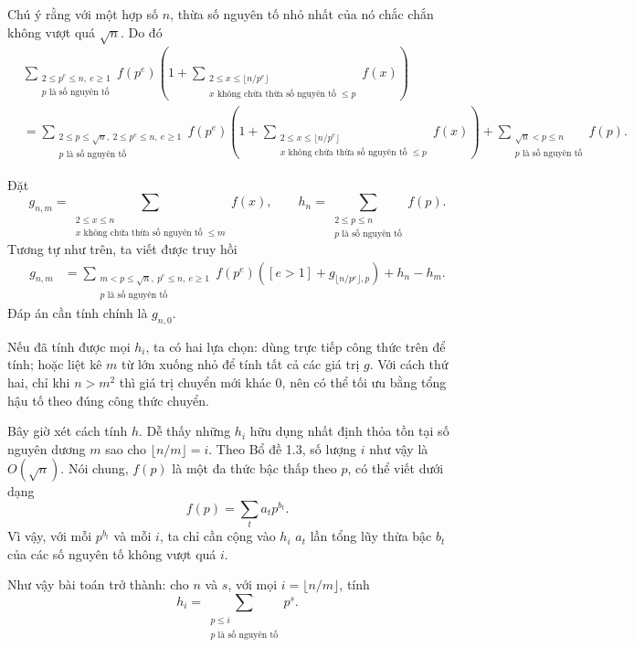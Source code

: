 \documentclass[11pt]{article}
\begin{document}
Chú ý rằng với một hợp số \(n\), thừa số nguyên tố nhỏ nhất của nó chắc chắn
không vượt quá \(\sqrt n\). Do đó
\[
\begin{aligned}
&\sum_{\substack{2\le p^e\le n,\ e\ge 1\\ p\text{ là số nguyên tố}}}
f(p^e)
\left(1+
\sum_{\substack{2\le x\le \lfloor n/p^e\rfloor\\
x\text{ không chứa thừa số nguyên tố }\le p}} f(x)\right)\\
&=\sum_{\substack{2\le p\le\sqrt n,\ 2\le p^e\le n,\ e\ge 1\\
p\text{ là số nguyên tố}}}
f(p^e)
\left(1+
\sum_{\substack{2\le x\le \lfloor n/p^e\rfloor\\
x\text{ không chứa thừa số nguyên tố }\le p}} f(x)\right)
+\sum_{\substack{\sqrt n<p\le n\\ p\text{ là số nguyên tố}}} f(p).
\end{aligned}
\]

Đặt
\[
  g_{n,m}=
  \sum_{\substack{2\le x\le n\\
  x\text{ không chứa thừa số nguyên tố }\le m}} f(x),
  \qquad
  h_n=\sum_{\substack{2\le p\le n\\p\text{ là số nguyên tố}}} f(p).
\]
Tương tự như trên, ta viết được truy hồi
\[
\begin{aligned}
g_{n,m}
&=\sum_{\substack{m<p\le\sqrt n,\ p^e\le n,\ e\ge 1\\
p\text{ là số nguyên tố}}}
f(p^e)
\left([e>1]+g_{\lfloor n/p^e\rfloor,p}\right)
+h_n-h_m.
\end{aligned}
\]
Đáp án cần tính chính là \(g_{n,0}\).

Nếu đã tính được mọi \(h_i\), ta có hai lựa chọn: dùng trực tiếp công thức trên
để tính; hoặc liệt kê \(m\) từ lớn xuống nhỏ để tính tất cả các giá trị \(g\).
Với cách thứ hai, chỉ khi \(n>m^2\) thì giá trị chuyển mới khác \(0\), nên có
thể tối ưu bằng tổng hậu tố theo đúng công thức chuyển.

Bây giờ xét cách tính \(h\). Dễ thấy những \(h_i\) hữu dụng nhất định thỏa tồn
tại số nguyên dương \(m\) sao cho \(\lfloor n/m\rfloor=i\). Theo Bổ đề 1.3, số
lượng \(i\) như vậy là \(O(\sqrt n)\). Nói chung, \(f(p)\) là một đa thức bậc
thấp theo \(p\), có thể viết dưới dạng
\[
  f(p)=\sum_t a_t p^{b_t}.
\]
Vì vậy, với mỗi \(p^{b_t}\) và mỗi \(i\), ta chỉ cần cộng vào \(h_i\) \(a_t\)
lần tổng lũy thừa bậc \(b_t\) của các số nguyên tố không vượt quá \(i\).

Như vậy bài toán trở thành: cho \(n\) và \(s\), với mọi
\(i=\lfloor n/m\rfloor\), tính
\[
  h_i=\sum_{\substack{p\le i\\p\text{ là số nguyên tố}}}p^s.
\]
\end{document}
